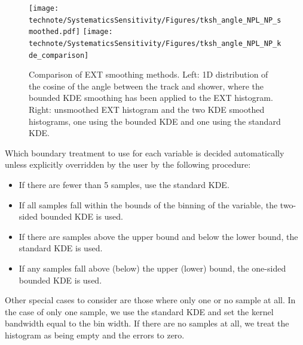 \begin{figure}
    \centering
    \texttt{[image: technote/SystematicsSensitivity/Figures/tksh\_angle\_NPL\_NP\_smoothed.pdf]}
    \texttt{[image: technote/SystematicsSensitivity/Figures/tksh\_angle\_NPL\_NP\_kde\_comparison]}
    \caption{Comparison of EXT smoothing methods. Left: 1D distribution of the cosine of the angle between the track and shower, where the bounded KDE smoothing has been applied to the EXT histogram. Right: unsmoothed EXT histogram and the two KDE smoothed histograms, one using the bounded KDE and one using the standard KDE.}
    \label{fig:EXT_smoothing}
\end{figure}
Which boundary treatment to use for each variable is decided automatically unless explicitly overridden by the user by the following procedure:
\begin{itemize}
    \item If there are fewer than 5 samples, use the standard KDE.
    \item If all samples fall within the bounds of the binning of the variable, the two-sided bounded KDE is used.
    \item If there are samples above the upper bound and below the lower bound, the standard KDE is used.
    \item If any samples fall above (below) the upper (lower) bound, the one-sided bounded KDE is used.
\end{itemize}
Other special cases to consider are those where only one or no sample at all. In the case of only one sample, we use the standard KDE and set the kernel bandwidth equal to the bin width. If there are no samples at all, we treat the histogram as being empty and the errors to zero.

